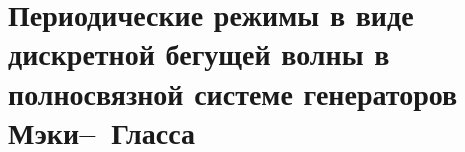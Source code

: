 \chapter{Периодические режимы в виде дискретной бегущей волны в полносвязной системе генераторов Мэки--~Гласса}\label{ch:ch2}


